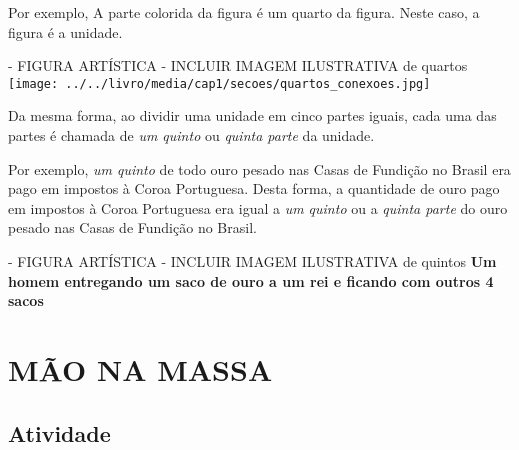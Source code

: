 \documentclass[a4paper,12pt,twoside]{book}
\begin{document}
Por exemplo,
A parte colorida da figura é um quarto da figura. Neste caso, a figura é a unidade.


\begin{imagem*}[breakable]{}{}   - FIGURA ARTÍSTICA - INCLUIR IMAGEM ILUSTRATIVA de quartos  
    \texttt{[image: ../../livro/media/cap1/secoes/quartos\_conexoes.jpg]}  
   \end{imagem*}

Da mesma forma, ao dividir uma unidade em cinco partes iguais, cada uma das partes é chamada de {\it um quinto} ou {\it quinta parte} da unidade.

Por exemplo,
{\it um quinto} de todo ouro pesado nas Casas de Fundição no Brasil era pago em impostos à Coroa Portuguesa. Desta forma, a quantidade de ouro pago em impostos à Coroa Portuguesa era igual a {\it um quinto} ou a {\it quinta parte} do ouro pesado nas Casas de Fundição no Brasil.

\begin{imagem*}[breakable]{}{}   - FIGURA ARTÍSTICA - INCLUIR IMAGEM ILUSTRATIVA de quintos   
  {\bf Um homem entregando um saco de ouro a um rei e ficando com outros 4 sacos}  
\end{imagem*}









\section*{MÃO NA MASSA }



\subsection{Atividade}
\end{document}
